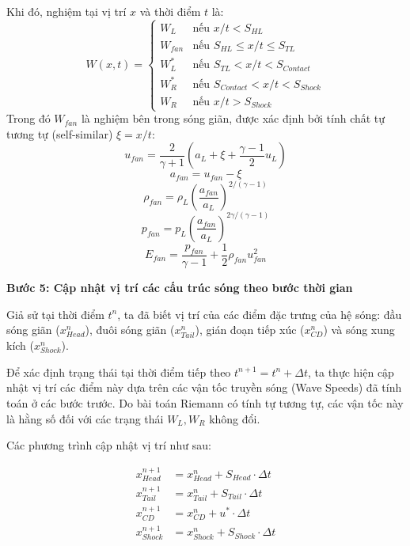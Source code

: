 Khi đó, nghiệm tại vị trí $x$ và thời điểm $t$ là:
\begin{equation*}
    W(x,t) = \begin{cases} 
    W_L & \text{nếu } x/t < S_{HL} \\
    W_{fan} & \text{nếu } S_{HL} \leq x/t \leq S_{TL} \\
    W_L^* & \text{nếu } S_{TL} < x/t < S_{Contact} \\
    W_R^* & \text{nếu } S_{Contact} < x/t < S_{Shock} \\
    W_R & \text{nếu } x/t > S_{Shock}
    \end{cases}
\end{equation*}
Trong đó $W_{fan}$ là nghiệm bên trong sóng giãn, được xác định bởi tính chất tự tương tự (self-similar) $\xi = x/t$:
\begin{equation*}
    u_{fan} = \frac{2}{\gamma+1}(a_L + \xi + \frac{\gamma-1}{2}u_L)
\end{equation*}
\begin{equation*}
    a_{fan} = u_{fan} - \xi
\end{equation*}
\begin{equation*}
    \rho_{fan} = \rho_L \left(\frac{a_{fan}}{a_L}\right)^{2/(\gamma-1)}
\end{equation*}
\begin{equation*}
    p_{fan} = p_L \left(\frac{a_{fan}}{a_L}\right)^{2\gamma/(\gamma-1)}
\end{equation*}
\begin{equation*}
    E_{fan} = \frac{p_{fan}}{\gamma-1} + \frac{1}{2}\rho_{fan} u_{fan}^2
\end{equation*}

\textbf{Bước 5: Cập nhật vị trí các cấu trúc sóng theo bước thời gian}

Giả sử tại thời điểm $t^n$, ta đã biết vị trí của các điểm đặc trưng của hệ sóng: đầu sóng giãn ($x_{Head}^n$), đuôi sóng giãn ($x_{Tail}^n$), gián đoạn tiếp xúc ($x_{CD}^n$) và sóng xung kích ($x_{Shock}^n$).

Để xác định trạng thái tại thời điểm tiếp theo $t^{n+1} = t^n + \Delta t$, ta thực hiện cập nhật vị trí các điểm này dựa trên các vận tốc truyền sóng (Wave Speeds) đã tính toán ở các bước trước. Do bài toán Riemann có tính tự tương tự, các vận tốc này là hằng số đối với các trạng thái $W_L, W_R$ không đổi.

Các phương trình cập nhật vị trí như sau:

\begin{align}
    x_{Head}^{n+1} &= x_{Head}^n + S_{Head} \cdot \Delta t \\
    x_{Tail}^{n+1} &= x_{Tail}^n + S_{Tail} \cdot \Delta t \\
    x_{CD}^{n+1}   &= x_{CD}^n   + u^* \cdot \Delta t \\
    x_{Shock}^{n+1}&= x_{Shock}^n + S_{Shock} \cdot \Delta t
\end{align}

